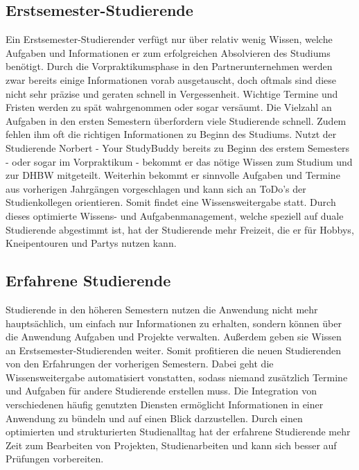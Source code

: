 \subsection{Erstsemester-Studierende}
Ein Erstsemester-Studierender verfügt nur über relativ wenig Wissen, welche Aufgaben und Informationen er zum erfolgreichen Absolvieren des Studiums benötigt. Durch die Vorpraktikumsphase in den Partnerunternehmen werden zwar bereits einige Informationen vorab ausgetauscht, doch oftmals sind diese nicht sehr präzise und geraten schnell in Vergessenheit. Wichtige Termine und Fristen werden zu spät wahrgenommen oder sogar versäumt. Die Vielzahl an Aufgaben in den ersten Semestern überfordern viele Studierende schnell. Zudem fehlen ihm oft die richtigen Informationen zu Beginn des Studiums. Nutzt der Studierende Norbert - Your StudyBuddy bereits zu Beginn des erstem Semesters - oder sogar im Vorpraktikum - bekommt er  das nötige Wissen zum Studium und zur DHBW mitgeteilt. Weiterhin bekommt er sinnvolle Aufgaben und Termine aus vorherigen Jahrgängen vorgeschlagen und kann sich an ToDo's der Studienkollegen orientieren. Somit findet eine Wissensweitergabe statt. Durch dieses optimierte Wissens- und Aufgabenmanagement, welche speziell auf duale Studierende abgestimmt ist, hat der Studierende mehr Freizeit, die er für Hobbys, Kneipentouren und Partys nutzen kann.

\subsection{Erfahrene Studierende}
Studierende in den höheren Semestern nutzen die Anwendung nicht mehr hauptsächlich, um einfach nur Informationen zu erhalten, sondern können über die Anwendung Aufgaben und Projekte verwalten. Außerdem geben sie Wissen an Erstsemester-Studierenden weiter. Somit profitieren die neuen Studierenden von den Erfahrungen  der vorherigen Semestern. Dabei geht die Wissensweitergabe automatisiert vonstatten, sodass niemand zusätzlich Termine und Aufgaben für andere Studierende erstellen muss. Die Integration von verschiedenen häufig genutzten Diensten ermöglicht Informationen in einer Anwendung zu bündeln und auf einen Blick darzustellen. Durch einen optimierten und strukturierten Studienalltag hat der erfahrene Studierende mehr Zeit zum Bearbeiten von Projekten, Studienarbeiten und kann sich besser auf Prüfungen vorbereiten.
